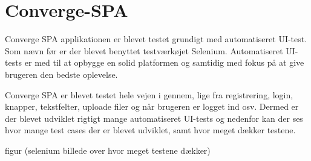 \chapter{Converge-SPA}
Converge SPA applikationen er blevet testet grundigt med automatiseret UI-test. Som nævn før er der blevet benyttet testværkøjet Selenium. Automatiseret UI-tests er med til at opbygge en solid platformen og samtidig med fokus på at give brugeren den bedste oplevelse.

Converge SPA er blevet testet hele vejen i gennem, lige fra registrering, login, knapper, tekstfelter, uploade filer og når brugeren er logget ind osv. Dermed er der blevet udviklet rigtigt mange automatiseret UI-tests og nedenfor kan der ses hvor mange test cases der er blevet udviklet, samt hvor meget dækker testene. 


figur (selenium billede over hvor meget testene dækker) 
